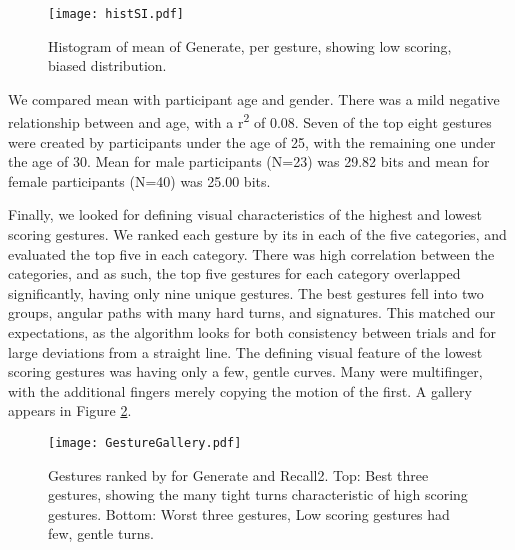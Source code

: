 \documentclass{sig-alternate-10pt}
\begin{document}
  \begin{figure}[!h]
  \centering
  \texttt{[image: histSI.pdf]}
\caption{Histogram of mean   of Generate, per gesture, showing low scoring, biased distribution.}
  \label{fig:histSI}
  \end{figure}
  










We compared mean  with participant age and gender. There was a mild negative relationship between  and age, with a r\textsuperscript{2} of 0.08. Seven of the top eight gestures were created by participants under the age of 25, with the remaining one under the age of 30. Mean  for male participants (N=23) was 29.82 bits and mean  for female participants (N=40) was 25.00 bits.






  












Finally, we looked for defining visual characteristics of the highest and lowest scoring gestures. We ranked each gesture by its  in each of the five categories, and evaluated the top five in each category. There was high correlation between the categories, and as such, the top five gestures for each category overlapped significantly, having only nine unique gestures. The best gestures fell into two groups, angular paths with many hard turns, and signatures. This matched our expectations, as the algorithm looks for both consistency between trials and for large deviations from a straight line. The defining visual feature of the lowest scoring gestures was having only a few, gentle curves. Many were multifinger, with the additional fingers merely copying the motion of the first.  A gallery  appears in Figure \ref{fig:gallerysummary}.

\begin{figure}[!h]
\begin{center}
\texttt{[image: GestureGallery.pdf]}
\caption{Gestures ranked by  for Generate and Recall2. Top: Best three gestures, showing the many tight turns characteristic of high scoring gestures. Bottom: Worst three gestures, Low scoring gestures had few, gentle turns.}
\label{fig:gallerysummary}
\end{center}
\end{figure}
\end{document}
